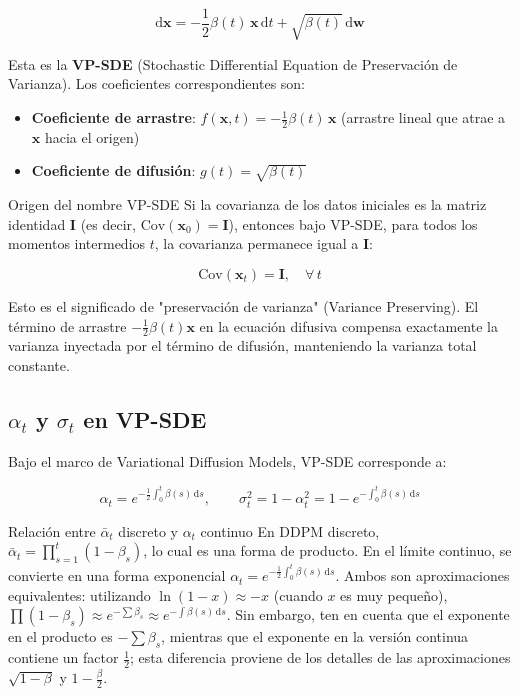 $$
\mathrm{d}\mathbf{x} = -\frac{1}{2}\beta(t)\,\mathbf{x}\,\mathrm{d}t + \sqrt{\beta(t)}\,\mathrm{d}\mathbf{w}
$$

Esta es la \textbf{VP-SDE} (Stochastic Differential Equation de Preservación de Varianza). Los coeficientes correspondientes son:

\begin{itemize}
    \item \textbf{Coeficiente de arrastre}: $f(\mathbf{x}, t) = -\frac{1}{2}\beta(t)\,\mathbf{x}$ (arrastre lineal que atrae a $\mathbf{x}$ hacia el origen)
    \item \textbf{Coeficiente de difusión}: $g(t) = \sqrt{\beta(t)}$
\end{itemize}

\begin{importantbox}{Origen del nombre VP-SDE}
Si la covarianza de los datos iniciales es la matriz identidad $\mathbf{I}$ (es decir, $\mathrm{Cov}(\mathbf{x}_0) = \mathbf{I}$), entonces bajo VP-SDE, para todos los momentos intermedios $t$, la covarianza permanece igual a $\mathbf{I}$:

$$
\mathrm{Cov}(\mathbf{x}_t) = \mathbf{I}, \quad \forall\, t
$$

Esto es el significado de "preservación de varianza" (Variance Preserving). El término de arrastre $-\frac{1}{2}\beta(t)\mathbf{x}$ en la ecuación difusiva compensa exactamente la varianza inyectada por el término de difusión, manteniendo la varianza total constante.
\end{importantbox}

\subsection{$\alpha_t$ y $\sigma_t$ en VP-SDE}

Bajo el marco de Variational Diffusion Models, VP-SDE corresponde a:

$$
\alpha_t = e^{-\frac{1}{2}\int_0^t \beta(s)\,\mathrm{d}s}, \qquad \sigma_t^2 = 1 - \alpha_t^2 = 1 - e^{-\int_0^t \beta(s)\,\mathrm{d}s}
$$

\begin{knowledgebox}{Relación entre $\bar{\alpha}_t$ discreto y $\alpha_t$ continuo}
En DDPM discreto, $\bar{\alpha}_t = \prod_{s=1}^t (1-\beta_s)$, lo cual es una forma de producto. En el límite continuo, se convierte en una forma exponencial $\alpha_t = e^{-\frac{1}{2}\int_0^t \beta(s)\,\mathrm{d}s}$. Ambos son aproximaciones equivalentes: utilizando $\ln(1-x) \approx -x$ (cuando $x$ es muy pequeño), $\prod(1-\beta_s) \approx e^{-\sum \beta_s} \approx e^{-\int \beta(s)\,\mathrm{d}s}$. Sin embargo, ten en cuenta que el exponente en el producto es $-\sum \beta_s$, mientras que el exponente en la versión continua contiene un factor $\frac{1}{2}$; esta diferencia proviene de los detalles de las aproximaciones $\sqrt{1-\beta}$ y $1-\frac{\beta}{2}$.
\end{knowledgebox}

